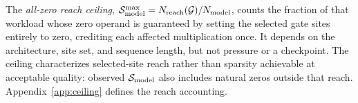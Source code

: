 The \emph{all-zero reach ceiling},
$\mathcal{S}_{\mathrm{model}}^{\max}=N_{\mathrm{reach}}(\mathcal{G})/N_{\mathrm{model}}$, counts the fraction
of that workload whose zero operand is guaranteed by setting the selected
gate sites entirely to zero, crediting each affected multiplication once. It depends on the architecture,
site set, and sequence length, but not pressure or a checkpoint. The ceiling
characterizes selected-site reach rather than sparsity achievable at acceptable
quality: observed $\mathcal{S}_{\mathrm{model}}$ also includes natural zeros outside that reach.
Appendix~\ref{app:ceiling} defines the reach accounting.
